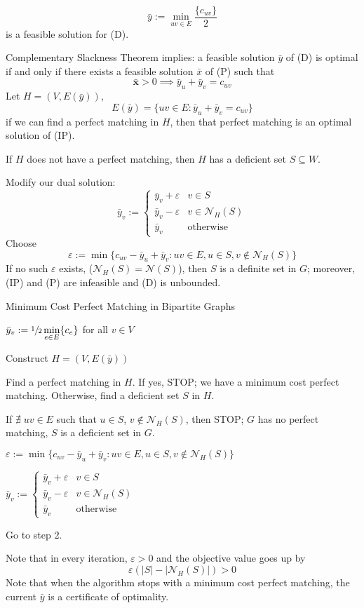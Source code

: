 \[ \bar{y}:=\min\limits_{uv\in E}\frac{\{c_{uv}\}}{2} \]
is a feasible solution for (D).

Complementary Slackness Theorem implies: a feasible solution
$ \bar{y} $ of (D) is optimal if and only if there exists a feasible
solution $ \bar{x} $ of (P) such that
\[ \bm{\bar{x}}>0\implies \bar{y}_u+\bar{y}_v=c_{uv} \]
Let $ H=(V,E(\bar{y})) $,
\[ E(\bar{y})=\{uv\in E: \bar{y}_u +\bar{y}_v=c_{uv}\} \]
if we can find a perfect matching in $ H $, then that perfect matching
is an optimal solution of (IP).

If $ H $ does not have a perfect matching, then $ H $ has a deficient
set $ S\subseteq W $.

Modify our dual solution:
\[ \bar{y}_v:=
    \begin{cases}
        \bar{y}_v+\varepsilon & v\in S                \\
        \bar{y}_v-\varepsilon & v\in \mathcal{N}_H(S) \\
        \bar{y}_v             & \text{otherwise}
    \end{cases} \]
Choose
\[ \varepsilon:=\min \{c_{uv}-\bar{y}_u+\bar{y}_v:uv\in E, u\in S, v\notin \mathcal{N}_H(S)\} \]
If no such $ \varepsilon $ exists, ($ \mathcal{N}_H(S)=\mathcal{N}(S) $),
then $ S $ is a definite set in $ G $; moreover, (IP) and (P) are infeasible
and (D) is unbounded.

\begin{algbox}
    \begin{algorithm}[H]
        \caption{Minimum Cost Perfect Matching in Bipartite Graphs}
        $ \bar{y}_v:=\sfrac{1}{2} \min\limits_{e\in E}\{c_e\} $ for all $ v\in V $

        Construct $ H=(V,E(\bar{y})) $

        Find a perfect matching in $ H $. If yes, STOP\@; we have a minimum cost
        perfect matching. Otherwise, find a deficient set $ S $ in $ H $.

        If $ \nexists\;uv\in E $ such that $ u\in S $, $ v\notin \mathcal{N}_H(S) $, then STOP\@;
        $ G $ has no perfect matching, $ S $ is a deficient set in $ G $.

        $ \varepsilon:=\min \{c_{uv}-\bar{y}_u+\bar{y}_v:uv\in E, u\in S, v\notin \mathcal{N}_H(S)\}  $

        $ \bar{y}_v:=
            \begin{cases}
                \bar{y}_v+\varepsilon & v\in S                \\
                \bar{y}_v-\varepsilon & v\in \mathcal{N}_H(S) \\
                \bar{y}_v             & \text{otherwise}
            \end{cases} $

        Go to step 2.
    \end{algorithm}
\end{algbox}

Note that in every iteration, $ \varepsilon>0 $ and the objective value goes up by
\[ \varepsilon(|S|-|\mathcal{N}_H(S)|)>0 \]
Note that when the algorithm stops with a minimum cost perfect matching, the current
$ \bar{y} $ is a certificate of optimality.

